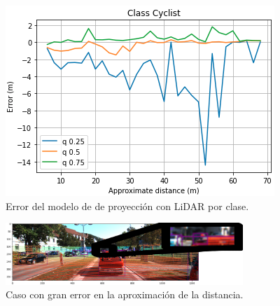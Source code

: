 \begin{figure}[H]
\begin{minipage}{0.32\textwidth}
		\includegraphics[width=1\linewidth]{Book/figures/6_approx_distancia/error_projection_cyclist_kitti3.png}
	\end{minipage}
	\caption{Error del modelo de de proyección con LiDAR por clase.}
	\label{fig:Error del modelo de de proyección con LiDAR por clase.}
\end{figure}

\begin{figure}[H]
    \centering
    \includegraphics[width=0.8\textwidth]{Book/figures/6_approx_distancia/detail_lidar.png}
    \caption{Caso con gran error en la aproximación de la distancia.}
    \label{fig:Caso con gran error en la aproximación de la distancia.}
\end{figure}

